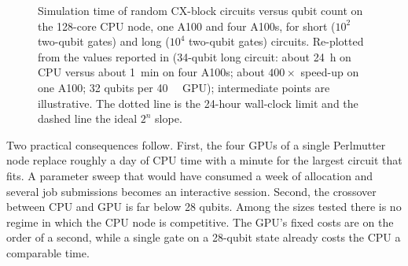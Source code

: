 \begin{figure}[htbp]
\centering
{}
\caption{Simulation time of random CX-block circuits versus qubit count on the 128-core CPU node, one A100 and four A100s, for short ($10^{2}$ two-qubit gates) and long ($10^{4}$ two-qubit gates) circuits. Re-plotted from the values reported in \cite{guo2025qgear} (34-qubit long circuit: about \SI{24}{\hour} on CPU versus about \SI{1}{\minute} on four A100s; about $400\times$ speed-up on one A100; 32 qubits per \SI{40}{\giga\byte} GPU); intermediate points are illustrative. The dotted line is the 24-hour wall-clock limit and the dashed line the ideal $2^{n}$ slope.}
\label{fig:qgear:cpu-gpu}
\end{figure}

Two practical consequences follow. First, the four GPUs of a single Perlmutter node replace roughly a day of CPU time with a minute for the largest circuit that fits. A parameter sweep that would have consumed a week of allocation and several job submissions becomes an interactive session. Second, the crossover between CPU and GPU is far below 28 qubits. Among the sizes tested there is no regime in which the CPU node is competitive. The GPU's fixed costs are on the order of a second, while a single gate on a 28-qubit state already costs the CPU a comparable time.

